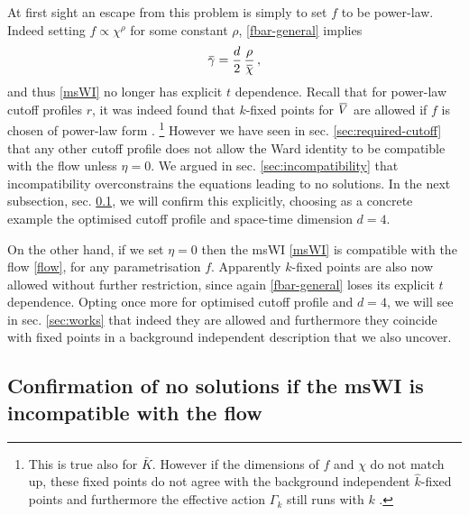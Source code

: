 \documentclass[11pt]{book}
\newcommand{\overbar}[1]{\mkern 1.5mu\overline{\mkern-1.5mu#1\mkern-1.5mu}\mkern 1.5mu}
\newcommand{\bV}{\overbar V}
\newcommand{\bg}{\overbar \gamma}
\newcommand{\bc}{\overbar \chi}
\numberwithin{equation}{chapter}
\begin{document}
At first sight an escape from this problem is simply to set $f$ to be power-law.
Indeed setting $f\propto\chi^{\rho}$ for some constant $\rho$, \eqref{fbar-general} implies
\begin{align}
  \bg = \frac{d}{2} \, \frac{\rho}{\bc}\,,
  \label{powlaw-gamma}
\end{align}
and thus \eqref{msWI} no longer has explicit $t$ dependence.
Recall that for power-law cutoff profiles $r$, it was indeed found that $k$-fixed points for $\bV$
are allowed if $f$ is chosen of power-law form \cite{Dietz:2015owa}.%
\footnote{This is true also for $\bar{K}$. However if the dimensions of $f$ and $\chi$ do not match up,
  these fixed points do not agree with the background independent $\hat{k}$-fixed points and furthermore
the effective action $\Gamma_k$ still runs with $k$ \cite{Dietz:2015owa}.}
However we have seen in sec. \ref{sec:required-cutoff} that any other cutoff profile does
not allow the Ward identity to be compatible with the flow unless $\eta=0$.
We argued in sec. \ref{sec:incompatibility} that incompatibility overconstrains the equations
leading to no solutions. In the next subsection, sec. \ref{sec:incompatible-no-solns},
we will confirm this explicitly, choosing as a concrete example the optimised cutoff profile and
space-time dimension $d=4$.

On the other hand, if we set $\eta=0$ then the msWI \eqref{msWI} is compatible with the flow \eqref{flow},
for any parametrisation $f$. Apparently $k$-fixed points are also now allowed without further restriction,
since again \eqref{fbar-general} loses its explicit $t$ dependence.
Opting once more for optimised cutoff profile and $d=4$, we will see in sec. \ref{sec:works} that
indeed they are allowed and furthermore they coincide with fixed points in a background independent
description that we also uncover.


\subsection{Confirmation of no solutions if the msWI is incompatible with the flow}
\label{sec:incompatible-no-solns}
\end{document}
